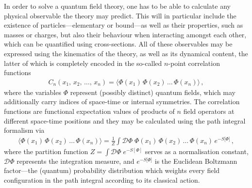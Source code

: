 \documentclass[11pt]{book}
\numberwithin{equation}{chapter}
\begin{document}
In order to solve a quantum field theory, one has to be
able to calculate any physical observable the theory may predict.
This will in particular include the existence of particles---elementary
or bound---as well as their properties, such as masses or charges,
but also their behaviour when interacting amongst each other, which
can be quantified using cross-sections.
All of these observables may be expressed using the kinematics
of the theory, as well as its dynamical content, the latter of
which is completely encoded in the so-called $n$-point correlation
functions
\begin{align}
  C_n(x_1, \, x_2,\, \dots, \, x_n) =
  \big\langle  \Phi(x_1) \, \Phi(x_2) \, \dots \, \Phi(x_n) \big\rangle \,,
\end{align}
where the variables $\Phi$ represent (possibly distinct) quantum fields,
which may additionally carry indices of space-time or internal symmetries.
The correlation functions are functional expectation values of products of $n$ field
operators at different space-time positions and they may be
calculated using the path integral formalism via
\begin{align}
  \big\langle  \Phi(x_1) \, \Phi(x_2) \, \dots \, \Phi(x_n) \big\rangle
  = \frac{1}{Z} \int \mathcal D \Phi \;
  \Phi(x_1) \, \Phi(x_2) \, \dots \, \Phi(x_n) \, e^{-S \lbrack \Phi \rbrack } \,,
  \label{eq:expvalue}
\end{align}
where the partition function $Z = \int \mathcal D \Phi \; e^{-S[\Phi]}$ serves as a
normalisation constant, $\mathcal D \Phi$ represents the integration measure,
and $e^{-S \lbrack \Phi \rbrack}$
is the Euclidean Boltzmann factor---the (quantum) probability distribution
which weights every field configuration in the path integral
according to its classical action.
\end{document}
